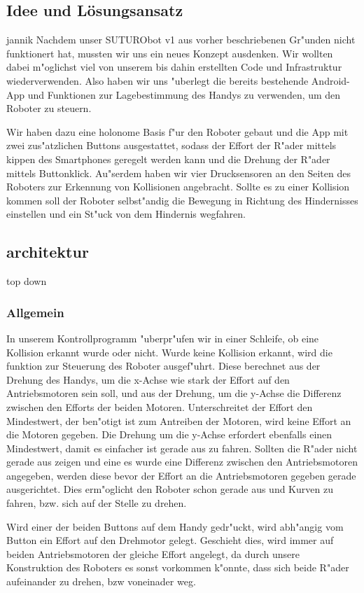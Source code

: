 \documentclass[8pt]{article}
\begin{document}
\subsection{Idee und Lösungsansatz} jannik
Nachdem unser SUTURObot v1 aus vorher beschriebenen Gr"unden nicht funktionert hat, mussten wir uns ein neues Konzept ausdenken. Wir wollten dabei m"oglichst viel von unserem bis dahin erstellten Code und Infrastruktur wiederverwenden. Also haben wir uns "uberlegt die bereits bestehende Android-App und Funktionen zur Lagebestimmung des Handys zu verwenden, um den Roboter zu steuern.

Wir haben dazu eine holonome Basis f"ur den Roboter gebaut und die App mit zwei zus"atzlichen Buttons ausgestattet, sodass der Effort der R"ader mittels kippen des Smartphones geregelt werden kann und die Drehung der R"ader mittels Buttonklick. Au"serdem haben wir vier Drucksensoren an den Seiten des Roboters zur Erkennung von Kollisionen angebracht. Sollte es zu einer Kollision kommen soll der Roboter selbst"andig die Bewegung in Richtung des Hindernisses einstellen und ein St"uck von dem Hindernis wegfahren.

\subsection{architektur}
top down

\subsubsection{Allgemein}
In unserem Kontrollprogramm "uberpr"ufen wir in einer Schleife, ob eine Kollision erkannt wurde oder nicht. Wurde keine Kollision erkannt, wird die funktion zur Steuerung des Roboter ausgef"uhrt. Diese berechnet aus der Drehung des Handys, um die x-Achse wie stark der Effort auf den Antriebsmotoren sein soll, und aus der Drehung, um die y-Achse die Differenz zwischen den Efforts der beiden Motoren. Unterschreitet der Effort den Mindestwert, der ben"otigt ist zum Antreiben der Motoren, wird keine Effort an die Motoren gegeben. Die Drehung um die y-Achse erfordert ebenfalls einen Mindestwert, damit es einfacher ist gerade aus zu fahren. Sollten die R"ader nicht gerade aus zeigen und eine es wurde eine Differenz zwischen den Antriebsmotoren angegeben, werden diese bevor der Effort an die Antriebsmotoren gegeben gerade ausgerichtet. Dies erm"oglicht den Roboter schon gerade aus und Kurven zu fahren, bzw. sich auf der Stelle zu drehen.

Wird einer der beiden Buttons auf dem Handy gedr"uckt, wird abh"angig vom Button ein Effort auf den Drehmotor gelegt. Geschieht dies, wird immer auf beiden Antriebsmotoren der gleiche Effort angelegt, da durch unsere Konstruktion des Roboters es sonst vorkommen k"onnte, dass sich beide R"ader aufeinander zu drehen, bzw voneinader weg.
  
\end{document}
